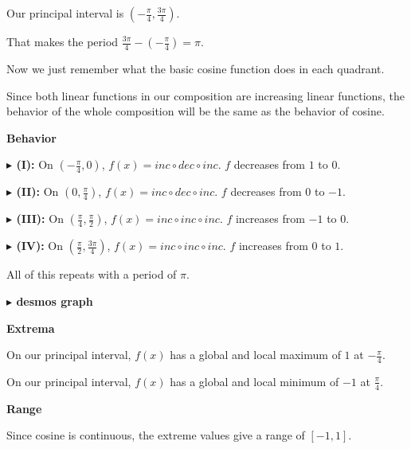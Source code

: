 \documentclass{ximera}
\begin{document}
\begin{example}
Our principal interval is $\left( -\frac{\pi}{4}, \frac{3\pi}{4} \right)$.

That makes the period $\frac{3\pi}{4} - \left( -\frac{\pi}{4} \right) = \pi$.


Now we just remember what the basic cosine function does in each quadrant. 



Since both linear functions in our composition are increasing linear functions, the behavior of the whole composition will be the same as the behavior of cosine.

\textbf{\textcolor{blue!55!black}{Behavior}} 



\textbf{\textcolor{blue!55!black}{$\blacktriangleright$ (I):}} On $\left( -\frac{\pi}{4}, 0 \right)$, $f(x) = inc \circ dec \circ inc$. $f$ decreases from $1$ to $0$.



\textbf{\textcolor{blue!55!black}{$\blacktriangleright$ (II):}} On $\left( 0, \frac{\pi}{4} \right)$, $f(x) = inc \circ dec \circ inc$. $f$ decreases from $0$ to $-1$.



\textbf{\textcolor{blue!55!black}{$\blacktriangleright$ (III):}} On $\left( \frac{\pi}{4}, \frac{\pi}{2} \right)$, $f(x) = inc \circ inc \circ inc$. $f$  increases from $-1$ to $0$.


\textbf{\textcolor{blue!55!black}{$\blacktriangleright$ (IV):}} On $\left( \frac{\pi}{2}, \frac{3\pi}{4} \right)$, $f(x) = inc \circ inc \circ inc$. $f$  increases from $0$ to $1$.



All of this repeats with a period of $\pi$.












\textbf{\textcolor{blue!55!black}{$\blacktriangleright$ desmos graph}} 
\begin{center}
\end{center}






\textbf{\textcolor{blue!55!black}{Extrema}} 


On our principal interval, $f(x)$ has a global and local maximum of $1$ at $-\frac{\pi}{4}$.


On our principal interval, $f(x)$ has a global and local minimum of $-1$ at $\frac{\pi}{4}$.





\textbf{\textcolor{blue!55!black}{Range}} 

Since cosine is continuous, the extreme values give a range of $[-1,1]$.


\end{example}
\end{document}
